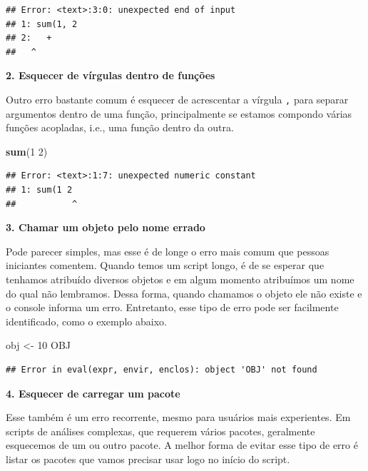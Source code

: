 \documentclass[
]{article}
\newenvironment{Shaded}{\begin{snugshade}}{\end{snugshade}}
\newcommand{\DecValTok}[1]{\textcolor[rgb]{0.00,0.00,0.81}{#1}}
\newcommand{\FunctionTok}[1]{\textcolor[rgb]{0.13,0.29,0.53}{\textbf{#1}}}
\newcommand{\NormalTok}[1]{#1}
\newcommand{\OtherTok}[1]{\textcolor[rgb]{0.56,0.35,0.01}{#1}}
\begin{document}
\begin{verbatim}
## Error: <text>:3:0: unexpected end of input
## 1: sum(1, 2
## 2:   +
##   ^
\end{verbatim}

\textbf{2. Esquecer de vírgulas dentro de funções}

Outro erro bastante comum é esquecer de acrescentar a vírgula \texttt{,} para separar argumentos dentro de uma função, principalmente se estamos compondo várias funções acopladas, i.e., uma função dentro da outra.

\begin{Shaded}
\begin{Highlighting}[]
\FunctionTok{sum}\NormalTok{(}\DecValTok{1} \DecValTok{2}\NormalTok{)}
\end{Highlighting}
\end{Shaded}

\begin{verbatim}
## Error: <text>:1:7: unexpected numeric constant
## 1: sum(1 2
##           ^
\end{verbatim}

\textbf{3. Chamar um objeto pelo nome errado}

Pode parecer simples, mas esse é de longe o erro mais comum que pessoas iniciantes comentem. Quando temos um script longo, é de se esperar que tenhamos atribuído diversos objetos e em algum momento atribuímos um nome do qual não lembramos. Dessa forma, quando chamamos o objeto ele não existe e o console informa um erro. Entretanto, esse tipo de erro pode ser facilmente identificado, como o exemplo abaixo.

\begin{Shaded}
\begin{Highlighting}[]
\NormalTok{obj }\OtherTok{\textless{}{-}} \DecValTok{10}
\NormalTok{OBJ}
\end{Highlighting}
\end{Shaded}

\begin{verbatim}
## Error in eval(expr, envir, enclos): object 'OBJ' not found
\end{verbatim}

\textbf{4. Esquecer de carregar um pacote}

Esse também é um erro recorrente, mesmo para usuários mais experientes. Em scripts de análises complexas, que requerem vários pacotes, geralmente esquecemos de um ou outro pacote. A melhor forma de evitar esse tipo de erro é listar os pacotes que vamos precisar usar logo no início do script.
\end{document}
